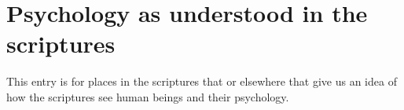 \section{Psychology as understood in the scriptures}
	\label{PSYCHOLOGY}
	
	This entry is for places in the scriptures that or elsewhere that give us an idea of how the scriptures see human beings and their psychology.
	




	

	

